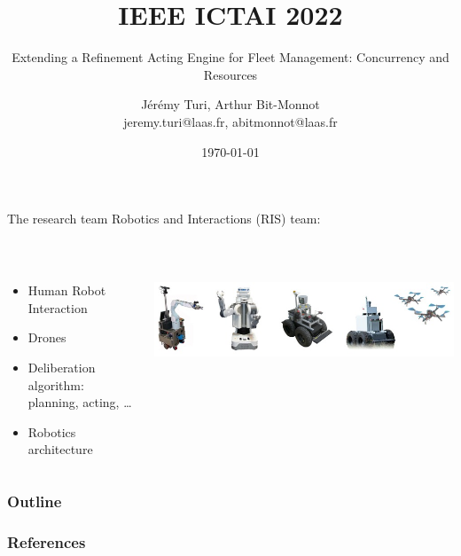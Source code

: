 \documentclass[handout, c,english]{beamer}
\title{IEEE ICTAI 2022}
\subtitle{Extending a Refinement Acting Engine for Fleet Management: Concurrency and Resources}
\author{Jérémy Turi, Arthur Bit-Monnot \\
jeremy.turi@laas.fr, abitmonnot@laas.fr}
\institute{\textit{LAAS-CNRS, Université de Toulouse, CNRS, INSA,} Toulouse, France}
\date{\today}
\begin{document}
\begin{frame}
\titlepage
\end{frame}



\begin{frame}{The research team}
  \centering
      Robotics and Interactions (RIS) team:
      
      ~~
  
  \begin{columns}
      \begin{column}{0.5\textwidth}
  \begin{itemize}
      \item Human Robot Interaction
      \item Drones
      \item Deliberation algorithm: planning, acting, \dots
      \item Robotics architecture
  \end{itemize}
      \end{column}
      \begin{column}{0.5\textwidth}
          \includegraphics[width=\textwidth]{images/RIS-robot-banner.jpg}
      \end{column}
  \end{columns}
  
\end{frame}

\begin{frame}
\frametitle{Outline}
\tableofcontents
\end{frame}







%
%
%
\begin{frame}[allowframebreaks]
  \frametitle{References}
  
  
\end{frame}
\end{document}
